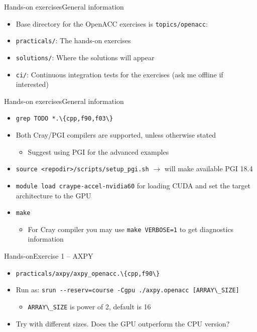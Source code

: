 \documentclass[12pt,aspectratio=169]{beamer}
\newcommand\shinline[2][]{\lstinline[style=shstyle,basicstyle=\ttfamily,#1]!#2!}
\begin{document}
\begin{frame}[fragile]{Hands-on exercises}{General information}
  \begin{itemize}
  \item Base directory for the OpenACC exercises is \shinline{topics/openacc}:
  \item \texttt{practicals/}: The hands-on exercises
  \item \texttt{solutions/}: Where the solutions will appear
  \item \texttt{ci/}: Continuous integration tests for the exercises (ask me offline if interested)
  \end{itemize}
\end{frame}

\begin{frame}[fragile]{Hands-on exercises}{General information}
  \begin{itemize}
  \item \shinline{grep TODO *.\{cpp,f90,f03\}}
  \item Both Cray/PGI compilers are supported, unless otherwise stated
    \begin{itemize}
    \item Suggest using PGI for the advanced examples
    \end{itemize}
  \item \shinline{source <repodir>/scripts/setup_pgi.sh} $\rightarrow$ will make available PGI 18.4
  \item \shinline{module load craype-accel-nvidia60} for loading CUDA and set the target architecture to the GPU
  \item \shinline{make}
    \begin{itemize}
    \item For Cray compiler you may use \shinline{make VERBOSE=1} to get diagnostics information
    \end{itemize}
  \end{itemize}
\end{frame}

\begin{frame}{Hands-on}{Exercise 1 -- AXPY}
  \begin{itemize}
  \item \shinline{practicals/axpy/axpy_openacc.\{cpp,f90\}}
  \item Run as: \shinline{srun --reserv=course -Cgpu ./axpy.openacc [ARRAY\_SIZE]}
    \begin{itemize}
    \item \shinline{ARRAY\_SIZE} is power of 2, default is 16
    \end{itemize}
  \item Try with different sizes. Does the GPU outperform the CPU version?
  \end{itemize}
\end{frame}
\end{document}
